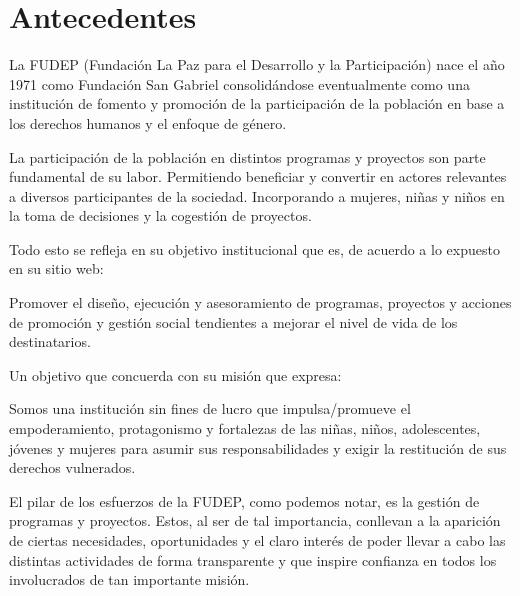 \section{Antecedentes}

La FUDEP (Fundación La Paz para el Desarrollo y la Participación) nace el año 1971 como Fundación San Gabriel consolidándose eventualmente como una institución de fomento y promoción de la participación de la población en base a los derechos humanos y el enfoque de género.

La participación de la población en distintos programas y proyectos son parte fundamental de su labor. Permitiendo beneficiar y convertir en actores relevantes a diversos participantes de la sociedad.  Incorporando a mujeres, niñas y niños en la toma de decisiones y la cogestión de proyectos.

Todo esto se refleja en su objetivo institucional que es, de acuerdo a lo expuesto en su sitio web:

\begin{displayquote}
Promover el diseño, ejecución y asesoramiento de programas, proyectos y acciones de promoción y gestión social tendientes a mejorar el nivel de vida de los destinatarios.
\end{displayquote}

Un objetivo que concuerda con su misión que expresa:

\begin{displayquote}
Somos una institución sin fines de lucro que impulsa/promueve el  empoderamiento, protagonismo y fortalezas de 
las niñas, niños, adolescentes, jóvenes y mujeres para asumir sus responsabilidades y exigir la restitución de sus derechos vulnerados.
\end{displayquote}

El pilar de los esfuerzos de la FUDEP, como podemos notar, es la gestión de programas y proyectos. Estos, al ser de tal importancia, conllevan a la aparición de ciertas necesidades, oportunidades y el claro interés de poder llevar a cabo las distintas actividades de forma transparente y que inspire confianza en todos los involucrados de tan importante misión.
